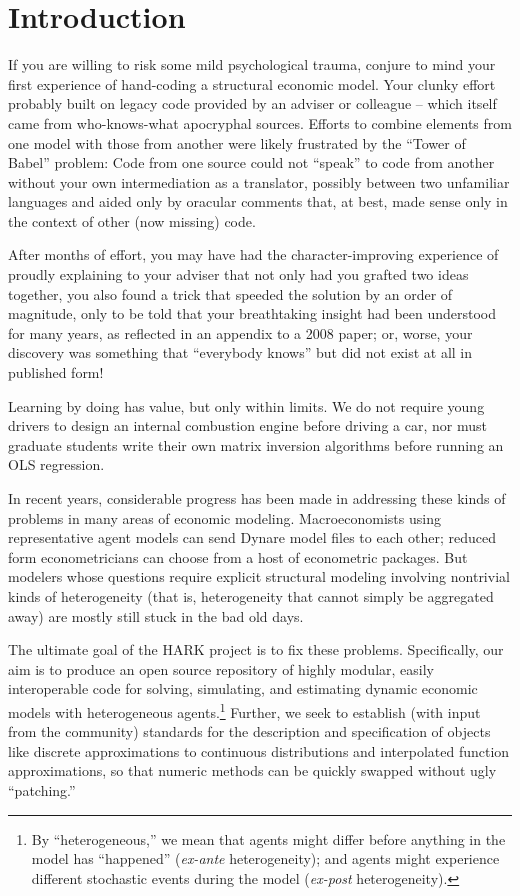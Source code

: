 \documentclass[12pt,titlepage,letterpaper]{econtex}
\begin{document}
{\thispagestyle{empty}
\newpage

\tableofcontents

\newpage

\section{Introduction}\label{sec:Introduction}

If you are willing to risk some mild psychological trauma, conjure to mind your first experience of hand-coding a structural economic model.  Your clunky effort probably built on legacy code provided by an adviser or colleague -- which itself came from who-knows-what apocryphal sources.  Efforts to combine elements from one model with those from another were likely frustrated by the ``Tower of Babel'' problem: Code from one source could not ``speak'' to code from another without your own intermediation as a translator, possibly between two unfamiliar languages and aided only by oracular comments that, at best, made sense only in the context of other (now missing) code.

After months of effort, you may have had the character-improving experience of proudly explaining to your adviser that not only had you grafted two ideas together, you also found a trick that speeded the solution by an order of magnitude, only to be told that your breathtaking insight had been understood for many years, as reflected in an appendix to a 2008 paper; or, worse, your discovery was something that ``everybody knows'' but did not exist at all in published form!

Learning by doing has value, but only within limits.  We do not require young drivers to design an internal combustion engine before driving a car, nor must graduate students write their own matrix inversion algorithms before running an OLS regression.  

In recent years, considerable progress has been made in addressing these kinds of problems in many areas of economic modeling.  Macroeconomists using representative agent models can send Dynare model files to each other; reduced form econometricians can choose from a host of econometric packages.  But modelers whose questions require explicit structural modeling involving nontrivial kinds of heterogeneity (that is, heterogeneity that cannot simply be aggregated away) are mostly still stuck in the bad old days.

The ultimate goal of the HARK project is to fix these problems.  Specifically, our aim is to produce an open source repository of highly modular, easily interoperable code for solving, simulating, and estimating dynamic economic models with heterogeneous agents.\footnote{By ``heterogeneous,'' we mean that agents might differ before anything in the model has ``happened'' (\textit{ex-ante} heterogeneity); and agents might experience different stochastic events during the model (\textit{ex-post} heterogeneity).}  Further, we seek to establish (with input from the community) standards for the description and specification of objects like discrete approximations to continuous distributions and interpolated function approximations, so that numeric methods can be quickly swapped without ugly ``patching.''

}
\end{document}
